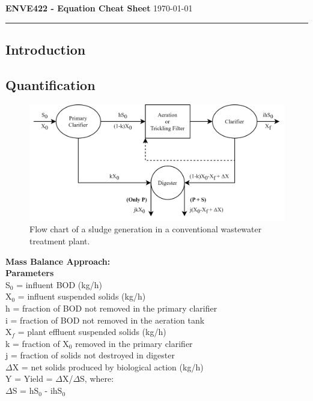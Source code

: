 \documentclass[a4paper, landscape, 8pt]{extarticle}
\begin{document}
\textbf{\LARGE ENVE422 - Equation Cheat Sheet\nocite{sanin_clarkson_vesilind_2011,vesilind_hartman_skene_1988,tchobanoglous_stensel_tsuchihashi_burton_2014}} \hfill \today
\hrule
\begin{multicols}{2}
\section*{Introduction}
\subsection*{Quantification}
\begin{figure}[H]
    \centering
    \includegraphics[scale = 1]{SludgeQuantities.png}
    \caption{Flow chart of a sludge generation in a conventional wastewater treatment plant.}
    \label{fig:sludge}
\end{figure}
\columnbreak
\begin{multicols}{2}
\doublespacing
\null \vfill
\textbf{\LARGE Mass Balance Approach:}\\
\textbf{\large Parameters}\\
S$_0$ = influent BOD (kg/h)\\
X$_0$ = influent suspended solids (kg/h)\\
h = fraction of BOD not removed in the primary clarifier\\
i = fraction of BOD not removed in the aeration tank\\
X$_f$ = plant effluent suspended solids (kg/h)\\
k = fraction of X$_0$ removed in the primary clarifier\\
j = fraction of solids not destroyed in digester\\
$\Delta$X = net solids produced by biological action (kg/h)\\
Y = Yield = $\Delta$X/$\Delta$S, where:\\
$\Delta$S = hS$_0$ - ihS$_0$
\vfill \null

\end{multicols}
\end{multicols}
\end{document}
